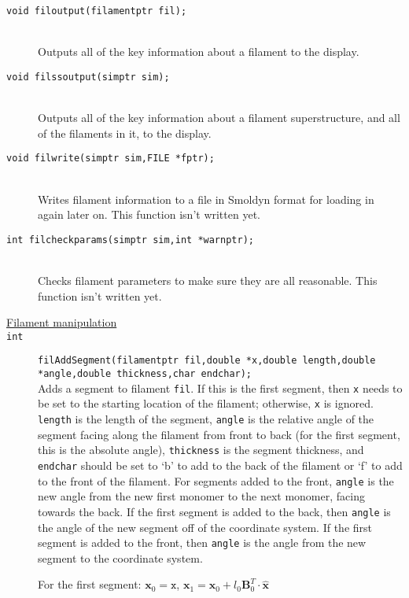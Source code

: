 \documentclass {book}
\begin{document}
\begin{description}
\item[\texttt{void filoutput(filamentptr fil);}]
\hfill \\
Outputs all of the key information about a filament to the display.

\item[\texttt{void filssoutput(simptr sim);}]
\hfill \\
Outputs all of the key information about a filament superstructure, and all of the filaments in it, to the display.

\item[\texttt{void filwrite(simptr sim,FILE *fptr);}]
\hfill \\
Writes filament information to a file in Smoldyn format for loading in again later on.  This function isn't written yet.

\item[\texttt{int filcheckparams(simptr sim,int *warnptr);}]
\hfill \\
Checks filament parameters to make sure they are all reasonable.  This function isn't written yet.

\item[\underline{Filament manipulation}]

\item[\texttt{int}]
\texttt{filAddSegment(filamentptr fil,double *x,double length,double *angle,double thickness,char endchar);}
\hfill \\
Adds a segment to filament \texttt{fil}.  If this is the first segment, then \texttt{x} needs to be set to the starting location of the filament; otherwise, \texttt{x} is ignored.  \texttt{length} is the length of the segment, \texttt{angle} is the relative angle of the segment facing along the filament from front to back (for the first segment, this is the absolute angle), \texttt{thickness} is the segment thickness, and \texttt{endchar} should be set to `b' to add to the back of the filament or `f' to add to the front of the filament.  For segments added to the front, \texttt{angle} is the new angle from the new first monomer to the next monomer, facing towards the back.  If the first segment is added to the back, then \texttt{angle} is the angle of the new segment off of the coordinate system.  If the first segment is added to the front, then \texttt{angle} is the angle from the new segment to the coordinate system.

For the first segment:
$\mathbf{x}_0=\texttt{x}$,
$\mathbf{x}_1=\mathbf{x}_0 + l_0 \mathbf{B}^T_0 \cdot \mathbf{\hat{x}}$


\end{description}
\end{document}
